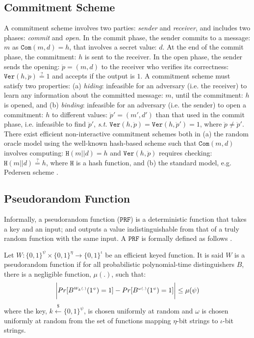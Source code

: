 \subsection{Commitment Scheme} A commitment scheme involves two parties:  \emph{sender} and  \emph{receiver}, and includes  two phases: \emph{commit} and  \emph{open}. In the commit phase, the sender  commits to a message: $m$ as $\mathtt{Com}(m,d)=h$, that involves a secret value: $d$. At the end of the commit phase,  the commitment: $h$ is sent to the receiver. In the open phase, the sender sends the opening: $\ddot{p}=(m,d)$ to the receiver who verifies its correctness: $\mathtt{Ver}(h,\ddot{p})\stackrel{\scriptscriptstyle ?}=1$ and accepts if the output is $1$.  A commitment scheme must satisfy two properties: (a) \textit{hiding}: infeasible for an adversary (i.e. the receiver) to learn any information about the committed  message: $m$, until the commitment: $h$ is opened, and (b) \textit{binding}:   infeasible for an adversary (i.e. the sender) to open a commitment: $h$ to different values: $\ddot{p}'=(m',d')$ than that used in the commit phase, i.e. infeasible to find  $\ddot{p}'$, \textit{s.t.} $\mathtt{Ver}(h,\ddot{p})=\mathtt{Ver}(h,\ddot{p}')=1$, where $\ddot{p}\neq \ddot{p}'$.  There exist efficient non-interactive  commitment schemes both in (a) the random oracle model using the well-known hash-based scheme such that $\mathtt{Com}(m,d)$ involves computing: $\mathtt{H}(m||d)=h$ and $\mathtt{Ver}(h,\ddot{p})$ requires checking: $\mathtt{H}(m||d)\stackrel{\scriptscriptstyle ?}=h$, where $\mathtt{H}$ is a hash function, and (b)  the standard model, e.g. Pedersen scheme \cite{Pedersen91}. 


\vspace{-5mm}


\subsection{Pseudorandom Function}

Informally, a pseudorandom function ($\mathtt{PRF}$) is a deterministic function that takes a key and an input; and outputs a value  indistinguishable from that of  a truly random function with the same input.   A $\mathtt{PRF}$ is formally defined as follows \cite{DBLP:books/crc/KatzLindell2007}. 
\begin{definition} Let $W:\{0,1\}^{\scriptscriptstyle\psi}\times \{0,1\}^{\scriptscriptstyle \eta}\rightarrow \{0,1\}^{\scriptscriptstyle  \iota}$ be an efficient  keyed function. It is said $W$ is a pseudorandom function if for all probabilistic polynomial-time distinguishers $B$, there is a negligible function, $\mu(.)$, such that:
\begin{equation*}
\small{
\bigg | Pr[B^{\scriptscriptstyle W_{k}(.)}(1^{\scriptscriptstyle \psi})=1]- Pr[B^{\scriptscriptstyle \omega(.)}(1^{\scriptscriptstyle \psi})=1] \bigg |\leq \mu(\psi)
}
\end{equation*}
where  the key, $k\stackrel{\scriptscriptstyle\$}\leftarrow\{0,1\}^{\scriptscriptstyle\psi}$, is chosen uniformly at random and $\omega$ is chosen uniformly at random from the set of functions mapping $\eta$-bit strings to $\iota$-bit strings. 
\end{definition}



